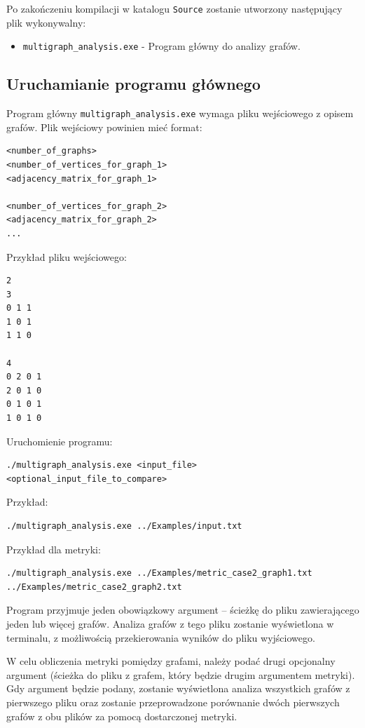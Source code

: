 Po zakończeniu kompilacji w katalogu \texttt{Source} zostanie utworzony następujący plik wykonywalny:
\begin{itemize}
    \item \texttt{multigraph\_analysis.exe} - Program główny do analizy grafów.
\end{itemize}

\subsection{Uruchamianie programu głównego}

Program główny \texttt{multigraph\_analysis.exe} wymaga pliku wejściowego z opisem grafów. Plik wejściowy powinien mieć format:

\begin{verbatim}
<number_of_graphs>
<number_of_vertices_for_graph_1>
<adjacency_matrix_for_graph_1>

<number_of_vertices_for_graph_2>
<adjacency_matrix_for_graph_2>
...
\end{verbatim}

Przykład pliku wejściowego:
\begin{verbatim}
2
3
0 1 1
1 0 1
1 1 0

4
0 2 0 1
2 0 1 0
0 1 0 1
1 0 1 0
\end{verbatim}

Uruchomienie programu:
\begin{verbatim}
./multigraph_analysis.exe <input_file> <optional_input_file_to_compare>
\end{verbatim}

Przykład:
\begin{verbatim}
./multigraph_analysis.exe ../Examples/input.txt
\end{verbatim}

Przykład dla metryki:
    {\small
\begin{verbatim}
./multigraph_analysis.exe ../Examples/metric_case2_graph1.txt ../Examples/metric_case2_graph2.txt
\end{verbatim}
}

Program przyjmuje jeden obowiązkowy argument – ścieżkę do pliku zawierającego jeden lub więcej grafów. Analiza grafów z tego pliku zostanie wyświetlona w terminalu, z możliwością przekierowania wyników do pliku wyjściowego.

W celu obliczenia metryki pomiędzy grafami, należy podać drugi opcjonalny argument (ścieżka do pliku z grafem, który będzie drugim argumentem metryki). Gdy argument będzie podany, zostanie wyświetlona analiza wszystkich grafów z pierwszego pliku oraz zostanie przeprowadzone porównanie dwóch pierwszych grafów z obu plików za pomocą dostarczonej metryki.


